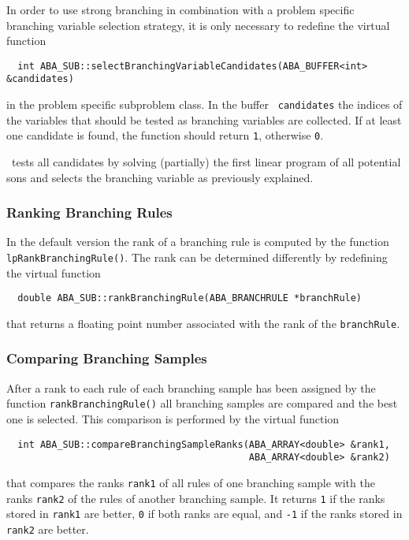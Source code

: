 In order to use strong branching in combination with a problem specific
branching variable selection strategy, it is only necessary to
redefine the virtual function
\begin{verbatim}
  int ABA_SUB::selectBranchingVariableCandidates(ABA_BUFFER<int> &candidates)
\end{verbatim}
in the problem specific subproblem class. In the buffer {\tt
  candidates} the indices of the variables that should be tested as
branching variables are collected. If at least one candidate is found,
the function should return {\tt 1}, otherwise {\tt 0}.

\ABACUS\ tests all candidates by solving (partially) the first
linear program of all potential sons and selects the branching
variable as previously explained.

\subsubsection{Ranking Branching Rules}

In the default version the rank of a branching rule is computed by the
function {\tt lpRankBranchingRule()}. The rank can be determined
differently by redefining the virtual function
\begin{verbatim}
  double ABA_SUB::rankBranchingRule(ABA_BRANCHRULE *branchRule)
\end{verbatim}
that returns a floating point number associated with the rank of the
{\tt branchRule}.

\subsubsection{Comparing Branching Samples}

After a rank to each rule of each branching sample has been assigned
by the function {\tt rankBranching\-Rule()} all branching samples
are compared and the best one is selected. This comparison is
performed by the virtual function
\begin{verbatim}
  int ABA_SUB::compareBranchingSampleRanks(ABA_ARRAY<double> &rank1,
                                           ABA_ARRAY<double> &rank2)
\end{verbatim}
that compares the ranks {\tt rank1} of all rules of one branching
sample with the ranks {\tt rank2} of the rules of another branching
sample. It returns {\tt 1} if the ranks stored in {\tt rank1} are
better, {\tt 0} if both ranks are equal, and {\tt -1} if the ranks
stored in {\tt rank2} are better.

